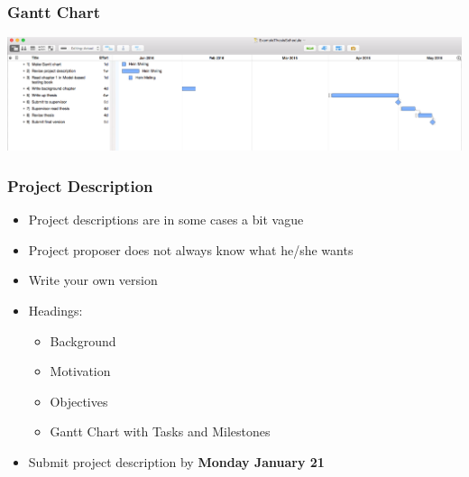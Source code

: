 \documentclass[hyperref={pdfpagelabels=false}, aspectratio=1610]{beamer}
\begin{document}
\begin{frame}
\frametitle{Gantt Chart}
 \begin{center}
  \includegraphics[scale=0.25]{fig/gantt-example}
 \end{center}
\end{frame}


\begin{frame}
\frametitle{Project Description}
\begin{block}{}
 \begin{itemize}
  \item Project descriptions are in some cases a bit vague
  \item Project proposer does not always know what he/she wants
  \item Write your own version
  \item Headings:
  \begin{itemize}
  	\item Background
	\item Motivation
	\item Objectives
	\item Gantt Chart with Tasks and Milestones
  \end{itemize}
  \item Submit project description by \textbf{Monday January 21}
 \end{itemize}
\end{block}
\end{frame}
\end{document}
